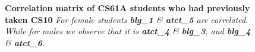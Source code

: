 \documentclass{beamer}                  %
\begin{document}
\begin{frame}
  \begin{figure}[!htbp]
      \centering
  \caption{\textbf{Correlation matrix of CS61A students who had previously taken CS10}
  \textit{For female students \textbf{blg\_1} \& \textbf{atct\_5} are correlated. While for males we observe that it is \textbf{atct\_4} \&  \textbf{blg\_3}, and \textbf{blg\_4} \& \textbf{atct\_6}.}}
  \label{corrHeatMapFemaleCS10CS61A}
  \end{figure}
\end{frame}
\end{document}
